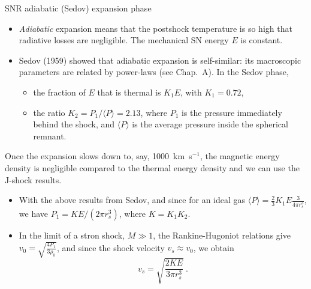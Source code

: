 \begin{frame}{SNR adiabatic (Sedov) expansion phase}


\begin{itemize}

\item {\em Adiabatic} expansion means that the postshock temperature
  is so high that radiative losses are negligible. The mechanical
  SN energy $E$ is constant. 

\item Sedov (1959) showed that adiabatic expansion is self-similar:
  its macroscopic parameters are related by power-laws (see
  Chap.~A). In the Sedov phase, 
\begin{itemize}
\item the fraction of $E$ that is thermal is $K_1 E$, with $K_1 =
  0.72$, 
\item the ratio $K_2 = P_1 / \langle P \rangle = 2.13$, where
  $P_1$ is the pressure immediately behind the shock, and $\langle P
  \rangle$ is the average pressure inside the spherical remnant.

\end{itemize}
\end{itemize}


\end{frame}





\begin{frame}{}

Once the expansion slows down to, say, 1000~km~s$^{-1}$, the magnetic
energy density is negligible compared to the thermal energy density
and we can use the J-shock results.

\begin{itemize}


\item With the above results from Sedov, and since for an ideal gas
  $\langle P \rangle = \frac{2}{3} K_1 E \frac{3}{4 \pi r_s^3}$, we
  have $ P_1 = K E / (2 \pi r_s^3)$, where $K = K_1 K_2$.

\item In the limit of a stron shock, $M \gg 1$, the Rankine-Hugoniot
  relations give $v_0 = \sqrt{ \frac{4  P_1}{3 \rho_0}}$, and since
  the shock velocity $v_s \approx v_0$, we obtain 
\begin{equation}
 v_s = \sqrt{ \frac{2 K E}{3 \pi r_s^3}} ~. \label{eq:adiavs}
\end{equation}

\end{itemize}

\end{frame}





